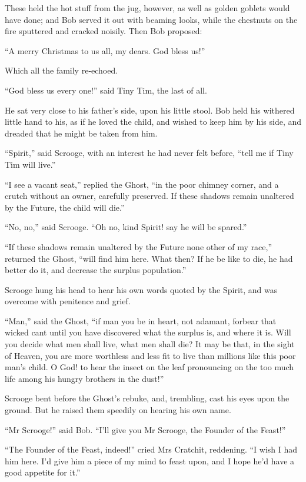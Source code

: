 \documentclass[paper=5.5in:8.5in,BCOR=5mm,twoside,DIV=calc,12pt,usegeometry]{scrbook} %
\begin{document}
These held the hot stuff from the jug, however, as well as golden goblets would have done; and Bob served it out with beaming looks, while the chestnuts on the fire sputtered and cracked noisily. Then Bob proposed:

\enquote{A merry Christmas to us all, my dears. God bless us!}

Which all the family re-echoed.

\enquote{God bless us every one!} said Tiny Tim, the last of all.

He sat very close to his father's side, upon his little stool. Bob held his withered little hand to his, as if he loved the child, and wished to keep him by his side, and dreaded that he might be taken from him.

\enquote{Spirit,} said Scrooge, with an interest he had never felt before, \enquote{tell me if Tiny Tim will live.}

\enquote{I see a vacant seat,} replied the Ghost, \enquote{in the poor chimney corner, and a crutch without an owner, carefully preserved. If these shadows remain unaltered by the Future, the child will die.}

\enquote{No, no,} said Scrooge. \enquote{Oh no, kind Spirit! say he will be spared.}

\enquote{If these shadows remain unaltered by the Future none other of my race,} returned the Ghost, \enquote{will find him here. What then? If he be like to die, he had better do it, and decrease the surplus population.}

Scrooge hung his head to hear his own words quoted by the Spirit, and was overcome with penitence and grief.

\enquote{Man,} said the Ghost, \enquote{if man you be in heart, not adamant, forbear that wicked cant until you have discovered what the surplus is, and where it is. Will you decide what men shall live, what men shall die? It may be that, in the sight of Heaven, you are more worthless and less fit to live than millions like this poor man's child. O God! to hear the insect on the leaf pronouncing on the too much life among his hungry brothers in the dust!}

Scrooge bent before the Ghost's rebuke, and, trembling, cast his eyes upon the ground. But he raised them speedily on hearing his own name.

\enquote{Mr Scrooge!} said Bob. \enquote{I'll give you Mr Scrooge, the Founder of the Feast!}

\enquote{The Founder of the Feast, indeed!} cried Mrs Cratchit, reddening. \enquote{I wish I had him here. I'd give him a piece of my mind to feast upon, and I hope he'd have a good appetite for it.}
\end{document}
